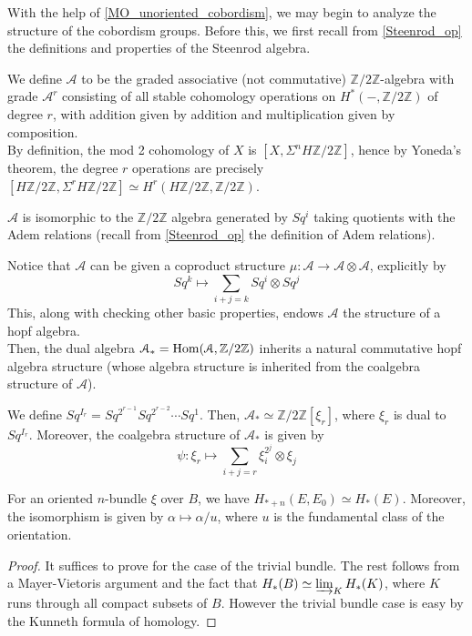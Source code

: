 	With the help of \cref{MO_unoriented_cobordism}, we may begin to analyze the structure of the cobordism groups. Before this, we first recall from \cref{Steenrod_op} the definitions and properties of the Steenrod algebra. 
	\begin{defn}
		We define $\mathcal{A}$ to be the graded associative (not commutative) $\mathbb{Z}/2\mathbb{Z}$-algebra with grade $\mathcal{A}^r$ consisting of all stable cohomology operations on $H^*(-,\mathbb{Z}/2\mathbb{Z})$ of degree $r$, with addition given by addition and multiplication given by composition. \\
		By definition, the mod 2 cohomology of $X$ is $[X,\Sigma^nH\mathbb{Z}/2\mathbb{Z}]$, hence by Yoneda's theorem, the degree $r$ operations are precisely $[H\mathbb{Z}/2\mathbb{Z},\Sigma^rH\mathbb{Z}/2\mathbb{Z}]\simeq H^r(H\mathbb{Z}/2\mathbb{Z},\mathbb{Z}/2\mathbb{Z})$. 
	\end{defn}
	\begin{thm}
		$\mathcal{A}$ is isomorphic to the $\mathbb{Z}/2\mathbb{Z}$ algebra generated by $Sq^i$ taking quotients with the Adem relations (recall from \cref{Steenrod_op} the definition of Adem relations). 
	\end{thm}
	\begin{const}
		Notice that $\mathcal{A}$ can be given a coproduct structure $\mu:\mathcal{A}\to\mathcal{A}\otimes\mathcal{A}$, explicitly by 
		\[ Sq^k\mapsto\sum_{i+j=k}Sq^i\otimes Sq^j \]
		This, along with checking other basic properties, endows $\mathcal{A}$ the structure of a hopf algebra. \\
		Then, the dual algebra $\mathcal{A}_*=\operatorname{\mathrm{Hom}}(\mathcal{A},\mathbb{Z}/2\mathbb{Z})$ inherits a natural commutative hopf algebra structure (whose algebra structure is inherited from the coalgebra structure of $\mathcal{A}$). 
	\end{const}
	\begin{thm}\label{Struct_A_*}
		We define $Sq^{I_r}=Sq^{2^{r-1}}Sq^{2^{r-2}}\cdots Sq^1$. Then, $\mathcal{A}_*\simeq\mathbb{Z}/2\mathbb{Z}[\xi_r]$, where $\xi_r$ is dual to $Sq^{I_r}$. Moreover, the coalgebra structure of $\mathcal{A}_*$ is given by 
		\[ \psi:\xi_r\mapsto\sum_{i+j=r}\xi^{2^j}_i\otimes\xi_j \]
	\end{thm}
	\begin{thm}\label{homology_Thom_isom}
		For an oriented $n$-bundle $\xi$ over $B$, we have $H_{*+n}(E,E_0)\simeq H_*(E)$. Moreover, the isomorphism is given by $\alpha\mapsto\alpha/u$, where $u$ is the fundamental class of the orientation. 
	\end{thm}
	\begin{proof}
		It suffices to prove for the case of the trivial bundle. The rest follows from a Mayer-Vietoris argument and the fact that $H_*(B)\simeq\varinjlim_{K}H_*(K)$, where $K$ runs through all compact subsets of $B$. However the trivial bundle case is easy by the Kunneth formula of homology. 
	\end{proof}

